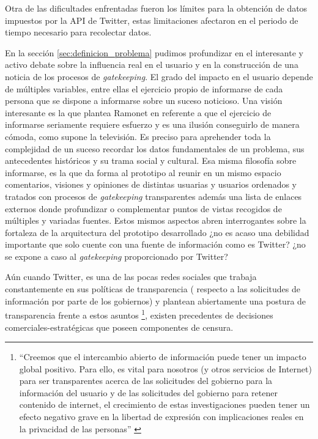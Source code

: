 Otra de las dificultades enfrentadas fueron los límites para la obtención de datos impuestos por la API de Twitter, estas limitaciones afectaron en el periodo de tiempo necesario para recolectar datos. 


En la sección \ref{sec:definicion_problema} pudimos profundizar en el interesante y activo debate sobre la influencia real en el usuario y en la construcción de una noticia de los procesos de \emph{gatekeeping}. El grado del impacto en el usuario depende de múltiples variables, entre ellas el ejercicio propio de informarse de cada persona que se dispone a informarse sobre un suceso noticioso. Una visión interesante es la que plantea Ramonet en \cite{fatigaInformarse} referente a que el ejercicio de informarse seriamente requiere esfuerzo y es una ilusión conseguirlo de manera cómoda, como supone la televisión. Es preciso para aprehender toda la complejidad de un suceso recordar los datos fundamentales de un problema, sus antecedentes históricos y su trama social y cultural. Esa misma filosofía sobre informarse, es la que da forma al prototipo al reunir en un mismo espacio comentarios, visiones y opiniones de distintas usuarias y usuarios ordenados y tratados con procesos de \emph{gatekeeping} transparentes además una lista de enlaces externos donde profundizar o complementar puntos de vistas recogidos de múltiples y variadas fuentes. Estos mismos aspectos abren interrogantes sobre la fortaleza de la arquitectura del prototipo desarrollado ¿no es acaso una debilidad importante que solo cuente con una fuente de información como es Twitter? ¿no se expone a caso al \emph{gatekeeping} proporcionado por Twitter?

Aún cuando Twitter, es una de las pocas redes sociales que trabaja constantemente en sus políticas de transparencia ( respecto a las solicitudes de información por parte de los gobiernos)  y plantean abiertamente una postura de transparencia frente a estos asuntos \footnote{``Creemos que el intercambio abierto de información puede tener un impacto global positivo. Para ello, es vital para nosotros (y otros servicios de Internet) para ser transparentes acerca de las solicitudes del gobierno para la información del usuario y de las solicitudes del gobierno para retener contenido de internet, el crecimiento de estas investigaciones pueden tener un efecto negativo grave en la libertad de expresión con implicaciones reales en la privacidad de las personas'' \cite{tweetsStillMustFlow} }, existen precedentes de decisiones comerciales-estratégicas que poseen componentes de censura.

